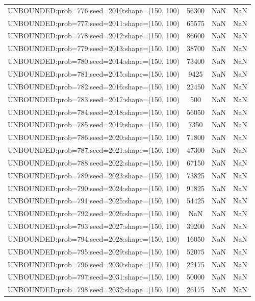 \begin{longtable}{lccc}
UNBOUNDED:prob=776:seed=2010:shape=(150, 100) & 56300 &   NaN &    NaN \\
UNBOUNDED:prob=777:seed=2011:shape=(150, 100) & 65575 &   NaN &    NaN \\
UNBOUNDED:prob=778:seed=2012:shape=(150, 100) & 86600 &   NaN &    NaN \\
UNBOUNDED:prob=779:seed=2013:shape=(150, 100) & 38700 &   NaN &    NaN \\
UNBOUNDED:prob=780:seed=2014:shape=(150, 100) & 73400 &   NaN &    NaN \\
UNBOUNDED:prob=781:seed=2015:shape=(150, 100) &  9425 &   NaN &    NaN \\
UNBOUNDED:prob=782:seed=2016:shape=(150, 100) & 22450 &   NaN &    NaN \\
UNBOUNDED:prob=783:seed=2017:shape=(150, 100) &   500 &   NaN &    NaN \\
UNBOUNDED:prob=784:seed=2018:shape=(150, 100) & 56050 &   NaN &    NaN \\
UNBOUNDED:prob=785:seed=2019:shape=(150, 100) &  7350 &   NaN &    NaN \\
UNBOUNDED:prob=786:seed=2020:shape=(150, 100) & 71800 &   NaN &    NaN \\
UNBOUNDED:prob=787:seed=2021:shape=(150, 100) & 47300 &   NaN &    NaN \\
UNBOUNDED:prob=788:seed=2022:shape=(150, 100) & 67150 &   NaN &    NaN \\
UNBOUNDED:prob=789:seed=2023:shape=(150, 100) & 73825 &   NaN &    NaN \\
UNBOUNDED:prob=790:seed=2024:shape=(150, 100) & 91825 &   NaN &    NaN \\
UNBOUNDED:prob=791:seed=2025:shape=(150, 100) & 54425 &   NaN &    NaN \\
UNBOUNDED:prob=792:seed=2026:shape=(150, 100) &   NaN &   NaN &    NaN \\
UNBOUNDED:prob=793:seed=2027:shape=(150, 100) & 39200 &   NaN &    NaN \\
UNBOUNDED:prob=794:seed=2028:shape=(150, 100) & 16050 &   NaN &    NaN \\
UNBOUNDED:prob=795:seed=2029:shape=(150, 100) & 52075 &   NaN &    NaN \\
UNBOUNDED:prob=796:seed=2030:shape=(150, 100) & 22175 &   NaN &    NaN \\
UNBOUNDED:prob=797:seed=2031:shape=(150, 100) & 50000 &   NaN &    NaN \\
UNBOUNDED:prob=798:seed=2032:shape=(150, 100) & 26175 &   NaN &    NaN \\

\end{longtable}
